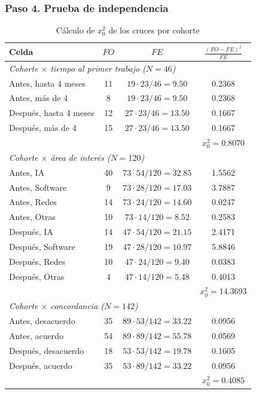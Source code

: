 \documentclass[12pt, a4paper]{article}
\newenvironment{mitabla}[2][H]{%
  \begin{table}[#1]
  \centering
  \caption{#2}
  \small
}{%
  \end{table}
}
\begin{document}
\subsubsection{Paso 4. Prueba de independencia}

\begin{mitabla}{Cálculo de $x_0^2$ de los cruces por cohorte}\label{tab:a4-chi}
\begin{tabular}{lccc}
\toprule
\textbf{Celda} & \textbf{$FO$} & \textbf{$FE$} & \textbf{$\frac{(FO-FE)^2}{FE}$} \\
\midrule
\multicolumn{4}{l}{\textit{Cohorte $\times$ tiempo al primer trabajo ($N = 46$)}} \\
Antes, hasta 4 meses & 11 & $19 \cdot 23/46 = 9.50$ & 0.2368 \\
Antes, más de 4 & 8 & $19 \cdot 23/46 = 9.50$ & 0.2368 \\
Después, hasta 4 meses & 12 & $27 \cdot 23/46 = 13.50$ & 0.1667 \\
Después, más de 4 & 15 & $27 \cdot 23/46 = 13.50$ & 0.1667 \\
 & & & $x_0^2 = 0.8070$ \\
\midrule
\multicolumn{4}{l}{\textit{Cohorte $\times$ área de interés ($N = 120$)}} \\
Antes, IA & 40 & $73 \cdot 54/120 = 32.85$ & 1.5562 \\
Antes, Software & 9 & $73 \cdot 28/120 = 17.03$ & 3.7887 \\
Antes, Redes & 14 & $73 \cdot 24/120 = 14.60$ & 0.0247 \\
Antes, Otras & 10 & $73 \cdot 14/120 = 8.52$ & 0.2583 \\
Después, IA & 14 & $47 \cdot 54/120 = 21.15$ & 2.4171 \\
Después, Software & 19 & $47 \cdot 28/120 = 10.97$ & 5.8846 \\
Después, Redes & 10 & $47 \cdot 24/120 = 9.40$ & 0.0383 \\
Después, Otras & 4 & $47 \cdot 14/120 = 5.48$ & 0.4013 \\
 & & & $x_0^2 = 14.3693$ \\
\midrule
\multicolumn{4}{l}{\textit{Cohorte $\times$ concordancia ($N = 142$)}} \\
Antes, desacuerdo & 35 & $89 \cdot 53/142 = 33.22$ & 0.0956 \\
Antes, acuerdo & 54 & $89 \cdot 89/142 = 55.78$ & 0.0569 \\
Después, desacuerdo & 18 & $53 \cdot 53/142 = 19.78$ & 0.1605 \\
Después, acuerdo & 35 & $53 \cdot 89/142 = 33.22$ & 0.0956 \\
 & & & $x_0^2 = 0.4085$ \\
\bottomrule
\end{tabular}
\end{mitabla}
\end{document}
